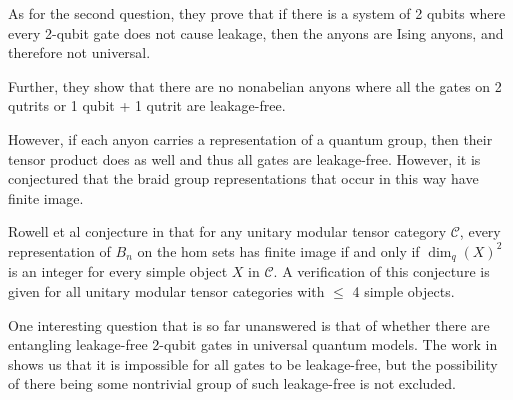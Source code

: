 As for the second question, they prove that if there is a system of 2 qubits
where every 2-qubit gate does not cause leakage, then the anyons are Ising
anyons, and therefore not universal.

Further, they show that there are no nonabelian anyons where all the gates on 2
qutrits or 1 qubit + 1 qutrit are leakage-free.

However, if each anyon carries a representation of a quantum group, then their
tensor product does as well and thus all gates are leakage-free. However, it is
conjectured that the braid group representations that occur in this way have
finite image.

Rowell et al conjecture in \cite{Rowell2007} that for any unitary modular
tensor category $\mathcal{C}$, every representation of $B_n$ on the hom sets
has finite image if and only if $\dim_q(X)^2$ is an integer for every simple
object $X$ in $\mathcal{C}$. A verification of this conjecture is given for all
unitary modular tensor categories with $\leq$ 4 simple objects.
       
One interesting question that is so far unanswered is that of whether there are
entangling leakage-free 2-qubit gates in universal quantum models. The work in
\cite{Ainsworth2011} shows us that it is impossible for all gates to be
leakage-free, but the possibility of there being some nontrivial group of such
leakage-free is not excluded. 
